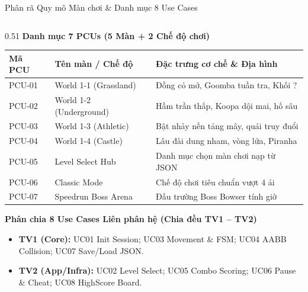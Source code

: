 \documentclass[aspectratio=169, 10pt]{beamer}
\begin{document}
\begin{frame}{Phân rã Quy mô Màn chơi \& Danh mục 8 Use Cases}
    \begin{columns}[T]
        \begin{column}{0.51\textwidth}
            \textbf{\footnotesize \textcolor{HUSTRed}{Danh mục 7 PCUs (5 Màn + 2 Chế độ chơi)}}
            \vspace{0.04cm}
            \begin{table}[h]
                \centering
                \tiny
                \begin{tabular}{@{}llp{3.3cm}@{}}
                    \toprule
                    \textbf{Mã PCU} & \textbf{Tên màn / Chế độ} & \textbf{Đặc trưng cơ chế \& Địa hình} \\
                    \midrule
                    \rowcolor{RowAltBg} PCU-01 & World 1-1 (Grassland) & Đồng cỏ mở, Goomba tuần tra, Khối ? \\
                    PCU-02 & World 1-2 (Underground) & Hầm trần thấp, Koopa dội mai, hố sâu \\
                    \rowcolor{RowAltBg} PCU-03 & World 1-3 (Athletic) & Bật nhảy nền tảng mây, quái truy đuổi \\
                    PCU-04 & World 1-4 (Castle) & Lâu đài dung nham, vòng lửa, Piranha \\
                    \rowcolor{RowAltBg} PCU-05 & Level Select Hub & Danh mục chọn màn chơi nạp từ JSON \\
                    PCU-06 & Classic Mode & Chế độ chơi tiêu chuẩn vượt 4 ải \\
                    \rowcolor{RowAltBg} PCU-07 & Speedrun Boss Arena & Đấu trường Boss Bowser tính giờ \\
                    \bottomrule
                \end{tabular}
            \end{table}

            \vspace{-0.12cm}
            \textbf{\footnotesize \textcolor{MarioBlue}{Phân chia 8 Use Cases Liên phân hệ (Chia đều TV1 -- TV2)}}
            \begin{itemize}\tiny\setlength{\itemsep}{0.8pt}
                \item \textbf{TV1 (Core):} UC01 Init Session; UC03 Movement \& FSM; UC04 AABB Collision; UC07 Save/Load JSON.
                \item \textbf{TV2 (App/Infra):} UC02 Level Select; UC05 Combo Scoring; UC06 Pause \& Cheat; UC08 HighScore Board.
            \end{itemize}
        \end{column}


\end{columns}
\end{frame}
\end{document}
